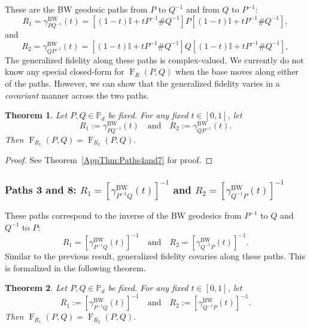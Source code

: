 \documentclass[12pt]{article}
\newtheorem{theorem}{Theorem}[section] %
\theoremstyle{definition}
\begin{document}
These are the BW geodesic paths from $P$ to $Q^{-1}$ and from $Q$ to $P^{-1}$:
\begin{equation}
R_1 = \gamma^{\mathrm{BW}}_{PQ^{-1}}(t) = \left[(1-t)\mathbb{I} + t P ^{-1} \# Q ^{-1}  \right] P \left[(1-t)\mathbb{I} + t P ^{-1} \# Q ^{-1}  \right],
\end{equation}
and
\begin{equation}
R_2 = \gamma^{\mathrm{BW}}_{QP^{-1}}(t) = \left[(1-t)\mathbb{I} + t P ^{-1} \# Q ^{-1}  \right] Q \left[(1-t)\mathbb{I} + t P ^{-1} \# Q ^{-1}  \right],
\end{equation}
The generalized fidelity along these paths is complex-valued. We currently do not know any special closed-form for $\operatorname{F}_R(P,Q) $ when the base moves along either of the paths. However, we can show that the generalized fidelity varies in a \textit{covariant} manner across the two paths. 
\begin{theorembox}
    \begin{theorem}\label{Thm:Paths4and7}
        Let $P,Q \in \mathbb{P}_d$ be fixed. For any fixed $t \in [0,1]$, let 
        \begin{equation}
            R_1 := \gamma_{P Q^{-1}}^{\mathrm{BW}}(t) \quad \text{and} \quad R_2 := \gamma_{Q P^{-1}}^{\mathrm{BW}}(t).
        \end{equation}
        Then $\operatorname{F}_{R_1}(P,Q) = \operatorname{F}_{R_2}(P,Q).$ 
    \end{theorem}
\end{theorembox}

\begin{proof}
    See Theorem~\ref{AppThm:Paths4and7} for proof. 
\end{proof}

\subsubsection*{Paths 3 and 8: $R_1 = [\gamma^\text{BW}_{P^{-1} Q}(t)]^{-1}$ and $R_2 = [\gamma^\text{BW}_{Q^{-1} P}(t)]^{-1}$}

These paths correspond to the inverse of the BW geodesics from $P^{-1}$ to $Q$ and $Q^{-1}$ to $P$:
\begin{equation}
R_1 = [\gamma^\text{BW}_{P^{-1} Q}(t)]^{-1} \quad \text{and} \quad R_2 = [\gamma^\text{BW}_{Q^{-1} P}(t)]^{-1}.
\end{equation}
Similar to the previous result, generalized fidelity covaries along these paths. This is formalized in the following theorem.
\begin{theorembox}
    \begin{theorem}\label{Thm:Paths3and8}
        Let $P,Q \in \mathbb P_d$ be fixed. For any fixed $t \in [0,1]$, let 
        \begin{equation}
            R_1 := [\gamma_{P ^{-1} Q}^{\mathrm{BW}} (t)] ^{-1}  \quad \text{and} \quad R_2 := [\gamma_{Q^{-1} P }^{\mathrm{BW}} (t)] ^{-1} .
        \end{equation}
        Then $\operatorname{F}_{R_1}(P,Q) = \operatorname{F}_{R_2}(P,Q). $ 
    \end{theorem}
\end{theorembox}
\end{document}
